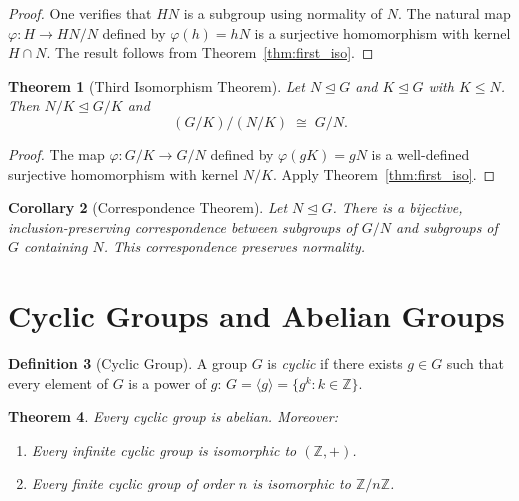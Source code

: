 \documentclass[12pt,a4paper]{amsart}
\newtheorem{theorem}{Theorem}[section]
\newtheorem{corollary}[theorem]{Corollary}
\theoremstyle{definition}
\newtheorem{definition}[theorem]{Definition}
\begin{document}
\begin{proof}
One verifies that $HN$ is a subgroup using normality of $N$. The natural map
$\varphi : H \to HN/N$ defined by $\varphi(h) = hN$ is a surjective homomorphism
with kernel $H \cap N$. The result follows from Theorem~\ref{thm:first_iso}.
\end{proof}

\begin{theorem}[Third Isomorphism Theorem]
\label{thm:third_iso}
Let $N \trianglelefteq G$ and $K \trianglelefteq G$ with $K \leq N$. Then
$N/K \trianglelefteq G/K$ and
\[
  (G/K) / (N/K) \;\cong\; G/N.
\]
\end{theorem}

\begin{proof}
The map $\varphi : G/K \to G/N$ defined by $\varphi(gK) = gN$ is a well-defined
surjective homomorphism with kernel $N/K$. Apply Theorem~\ref{thm:first_iso}.
\end{proof}

\begin{corollary}[Correspondence Theorem]
Let $N \trianglelefteq G$. There is a bijective, inclusion-preserving correspondence
between subgroups of $G/N$ and subgroups of $G$ containing $N$. This correspondence
preserves normality.
\end{corollary}

\section{Cyclic Groups and Abelian Groups}
\label{sec:cyclic}

\begin{definition}[Cyclic Group]
A group $G$ is \emph{cyclic} if there exists $g \in G$ such that every element of
$G$ is a power of $g$: $G = \langle g \rangle = \{g^k : k \in \mathbb{Z}\}$.
\end{definition}

\begin{theorem}
Every cyclic group is abelian. Moreover:
\begin{enumerate}[label=(\roman*)]
  \item Every infinite cyclic group is isomorphic to $(\mathbb{Z}, +)$.
  \item Every finite cyclic group of order $n$ is isomorphic to $\mathbb{Z}/n\mathbb{Z}$.
\end{enumerate}
\end{theorem}
\end{document}
